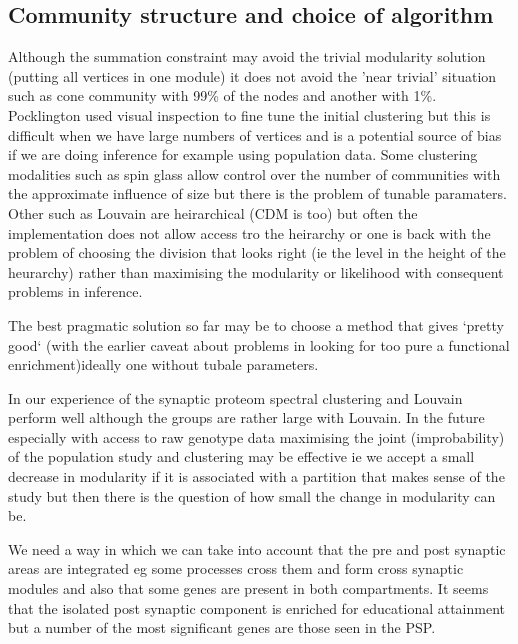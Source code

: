 \subsection{Community structure and choice of algorithm}

Although the summation constraint  may avoid the trivial modularity solution (putting all vertices in one module) it does not avoid the 'near trivial' situation such as cone community with 99\% of the nodes and another with 1\%. Pocklington used visual inspection to fine tune the initial clustering but this is difficult when we have large numbers of vertices and is a potential source of bias if we are doing inference for example using population data. Some clustering modalities such as spin glass allow control over the number of communities with the approximate influence of size but there is the problem of tunable paramaters. Other such as Louvain are heirarchical (CDM is too) but often the implementation does not allow access tro the heirarchy or one is back with the problem of choosing the division that looks right (ie the level in the height of the heurarchy) rather than maximising the modularity or likelihood with consequent problems in inference. 

The best pragmatic solution so far may be to choose a method that gives `pretty good` (with the earlier caveat about problems in looking for too pure a functional enrichment)ideally one without tubale parameters. 

In our experience of the synaptic proteom spectral clustering and Louvain perform well although the groups are rather large with Louvain. In the future especially with access to raw genotype data maximising the joint (improbability) of the population study and clustering may be effective ie we accept a small decrease in modularity if it is associated with a partition that makes sense of the study but then there is the question of how small the change in modularity can be. 



We need a way in which we can take into account that the pre and post synaptic areas are integrated eg some processes cross them and form cross synaptic modules and also that some genes are present in both compartments. It seems that the isolated post synaptic component is enriched for educational attainment but a number of the most significant genes are those seen in the PSP.

